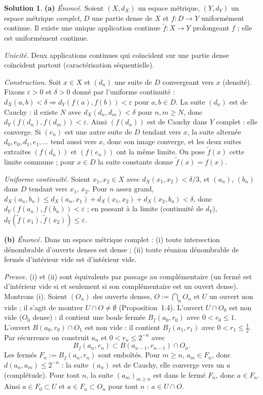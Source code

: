 \documentclass[11pt,a4paper]{article}
\newcommand{\Bf}{B_f}
\theoremstyle{definition}
\newtheorem*{solution}{Solution}
\begin{document}
\begin{solution}
\noindent\textbf{(a)} \emph{Énoncé.} Soient $(X,d_X)$ un espace métrique, $(Y,d_Y)$ un espace métrique \emph{complet}, $D$ une partie dense de $X$ et $f:D\to Y$ uniformément continue. Il existe une unique application continue $\tilde f:X\to Y$ prolongeant $f$ ; elle est uniformément continue.

\emph{Unicité.} Deux applications continues qui coïncident sur une partie dense coïncident partout (caractérisation séquentielle).

\emph{Construction.} Soit $x\in X$ et $(d_n)$ une suite de $D$ convergeant vers $x$ (densité). Fixons $\varepsilon>0$ et $\delta>0$ donné par l'uniforme continuité : $d_X(a,b)<\delta\Rightarrow d_Y(f(a),f(b))<\varepsilon$ pour $a,b\in D$. La suite $(d_n)$ est de Cauchy : il existe $N$ avec $d_X(d_n,d_m)<\delta$ pour $n,m\ge N$, donc $d_Y(f(d_n),f(d_m))<\varepsilon$. Ainsi $(f(d_n))$ est de Cauchy dans $Y$ complet : elle converge. Si $(e_n)$ est une autre suite de $D$ tendant vers $x$, la suite alternée $d_0,e_0,d_1,e_1,\dots$ tend aussi vers $x$, donc son image converge, et les deux suites extraites $(f(d_n))$ et $(f(e_n))$ ont la même limite. On pose $\tilde f(x)$ cette limite commune ; pour $x\in D$ la suite constante donne $\tilde f(x)=f(x)$.

\emph{Uniforme continuité.} Soient $x_1,x_2\in X$ avec $d_X(x_1,x_2)<\delta/3$, et $(a_n)$, $(b_n)$ dans $D$ tendant vers $x_1$, $x_2$. Pour $n$ assez grand, $d_X(a_n,b_n)\le d_X(a_n,x_1)+d_X(x_1,x_2)+d_X(x_2,b_n)<\delta$, donc $d_Y(f(a_n),f(b_n))<\varepsilon$ ; en passant à la limite (continuité de $d_Y$), $d_Y(\tilde f(x_1),\tilde f(x_2))\le\varepsilon$.

\medskip
\noindent\textbf{(b)} \emph{Énoncé.} Dans un espace métrique complet : (i) toute intersection dénombrable d'ouverts denses est dense ; (ii) toute réunion dénombrable de fermés d'intérieur vide est d'intérieur vide.

\emph{Preuve.} (i) et (ii) sont équivalents par passage au complémentaire (un fermé est d'intérieur vide si et seulement si son complémentaire est un ouvert dense). Montrons (i). Soient $(O_n)$ des ouverts denses, $O:=\bigcap_nO_n$ et $U$ un ouvert non vide ; il s'agit de montrer $U\cap O\ne\emptyset$ (Proposition~1.4). L'ouvert $U\cap O_0$ est non vide ($O_0$ dense) : il contient une boule fermée $\Bf(a_0,r_0)$ avec $0<r_0\le1$. L'ouvert $B(a_0,r_0)\cap O_1$ est non vide : il contient $\Bf(a_1,r_1)$ avec $0<r_1\le\frac12$. Par récurrence on construit $a_n$ et $0<r_n\le2^{-n}$ avec
\[
\Bf(a_n,r_n)\subset B(a_{n-1},r_{n-1})\cap O_n .
\]
Les fermés $F_n:=\Bf(a_n,r_n)$ sont emboîtés. Pour $m\ge n$, $a_m\in F_n$, donc $d(a_n,a_m)\le2^{-n}$ : la suite $(a_n)$ est de Cauchy, elle converge vers un $a$ (complétude). Pour tout $n$, la suite $(a_m)_{m\ge n}$ est dans le fermé $F_n$, donc $a\in F_n$. Ainsi $a\in F_0\subset U$ et $a\in F_n\subset O_n$ pour tout $n$ : $a\in U\cap O$.


\end{solution}
\end{document}

